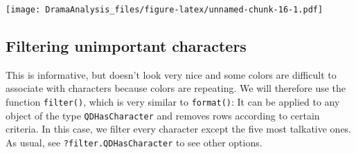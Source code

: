 \documentclass[]{book}
\newenvironment{Shaded}{\begin{snugshade}}{\end{snugshade}}
\newcommand{\CommentTok}[1]{\textcolor[rgb]{0.56,0.35,0.01}{\textit{#1}}}
\newcommand{\DataTypeTok}[1]{\textcolor[rgb]{0.13,0.29,0.53}{#1}}
\newcommand{\DecValTok}[1]{\textcolor[rgb]{0.00,0.00,0.81}{#1}}
\newcommand{\FloatTok}[1]{\textcolor[rgb]{0.00,0.00,0.81}{#1}}
\newcommand{\KeywordTok}[1]{\textcolor[rgb]{0.13,0.29,0.53}{\textbf{#1}}}
\newcommand{\NormalTok}[1]{#1}
\newcommand{\OperatorTok}[1]{\textcolor[rgb]{0.81,0.36,0.00}{\textbf{#1}}}
\newcommand{\StringTok}[1]{\textcolor[rgb]{0.31,0.60,0.02}{#1}}
\begin{document}
\texttt{[image: DramaAnalysis\_files/figure-latex/unnamed-chunk-16-1.pdf]}

\hypertarget{filter}{%
\subsection{Filtering unimportant characters}\label{filter}}

This is informative, but doesn't look very nice and some colors are difficult to associate with characters because colors are repeating. We will therefore use the function \texttt{filter()}, which is very similar to \texttt{format()}: It can be applied to any object of the type \texttt{QDHasCharacter} and removes rows according to certain criteria. In this case, we filter every character except the five most talkative ones. As usual, see \texttt{?filter.QDHasCharacter} to see other options.

\begin{Shaded}
\end{Shaded}
\end{document}
